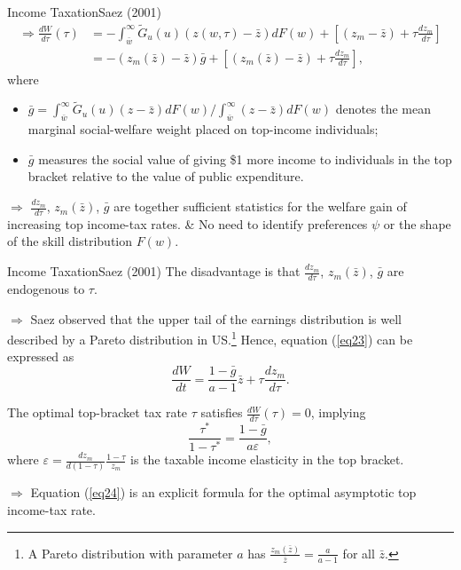 \documentclass{beamer}
\begin{document}
\begin{frame}{Income Taxation}{Saez (2001)}
	\begin{equation}
		\begin{aligned}\label{eq23}
			\Rightarrow \frac{dW}{d\tau}(\tau) &= -\int_{\bar{w}}^\infty\tilde{G}_u(u)(z(w,\tau)-\bar{z})dF(w) + \left[(z_m-\bar{z})+\tau\frac{dz_m}{d\tau}\right] \\
			&= -(z_m(\bar{z})-\bar{z})\bar{g} + \left[(z_m(\bar{z})-\bar{z})+\tau\frac{dz_m}{d\tau}\right],
		\end{aligned}
	\end{equation}
	where
	\begin{itemize}
		\item $\bar{g}=\int_{\bar{w}}^\infty \tilde{G}_u(u)(z-\bar{z})dF(w)/\int_{\bar{w}}^\infty (z-\bar{z})dF(w)$ denotes the mean marginal social-welfare weight placed on top-income individuals;
		\item $\bar{g}$ measures the social value of giving \$1 more income to individuals in the top bracket relative to the value of public expenditure.
	\end{itemize}
	\medskip

	$\Rightarrow$ $\frac{dz_m}{d\tau}$, $z_m(\bar{z})$, $\bar{g}$ are together sufficient statistics for the welfare gain of increasing top income-tax rates. \& No need to identify preferences $\psi$ or the shape of the skill distribution $F(w)$.
\end{frame}
\begin{frame}{Income Taxation}{Saez (2001)}
	The disadvantage is that $\frac{dz_m}{d\tau}$, $z_m(\bar{z})$, $\bar{g}$ are endogenous to $\tau$.
	\medskip

	$\Rightarrow$ Saez observed that the upper tail of the earnings distribution is well described by a Pareto distribution in US.\footnote{A Pareto distribution with parameter $a$ has $\frac{z_m(\bar{z})}{\bar{z}}=\frac{a}{a-1}$ for all $\bar{z}$.} Hence, equation (\ref{eq23}) can be expressed as
	\begin{equation}
		\frac{dW}{dt} = \frac{1-\bar{g}}{a-1}\bar{z} + \tau\frac{dz_m}{d\tau}.
	\end{equation}

	The optimal top-bracket tax rate $\tau$ satisfies $\frac{dW}{d\tau}(\tau)=0$, implying
	\begin{equation}\label{eq24}
		\frac{\tau^*}{1-\tau^*} = \frac{1-\bar{g}}{a\varepsilon},
	\end{equation}
	where $\varepsilon=\frac{dz_m}{d(1-\tau)}\frac{1-\tau}{z_m}$ is the taxable income elasticity in the top bracket.
	\medskip

	$\Rightarrow$ Equation (\ref{eq24}) is an explicit formula for the optimal asymptotic top income-tax rate.
\end{frame}
\end{document}
